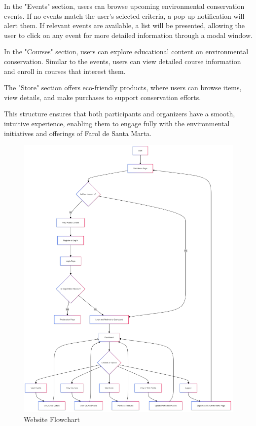 In the "Events" section, users can browse upcoming environmental conservation events. If no events match the user's selected criteria, a pop-up notification will alert them. If relevant events are available, a list will be presented, allowing the user to click on any event for more detailed information through a modal window.

In the "Courses" section, users can explore educational content on environmental conservation. Similar to the events, users can view detailed course information and enroll in courses that interest them.

The "Store" section offers eco-friendly products, where users can browse items, view details, and make purchases to support conservation efforts. 

This structure ensures that both participants and organizers have a smooth, intuitive experience, enabling them to engage fully with the environmental initiatives and offerings of Farol de Santa Marta.

\begin{figure}
    \centering
    \includegraphics[width=1\linewidth]{images/mermaid-flow.png}
    \caption{Website Flowchart}
    \label{fig:Flowchart}
\end{figure}


